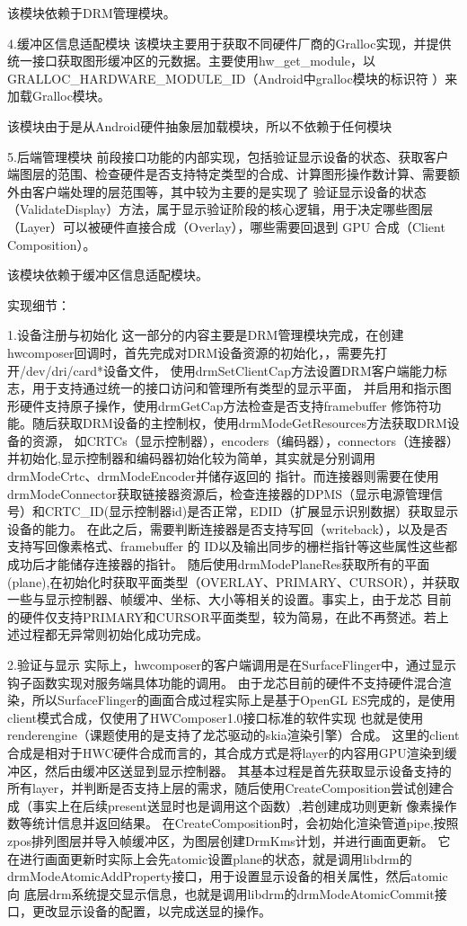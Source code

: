 该模块依赖于DRM管理模块。

4.缓冲区信息适配模块
该模块主要用于获取不同硬件厂商的Gralloc实现，并提供统一接口获取图形缓冲区的元数据。主要使用hw\_get\_module，以GRALLOC\_HARDWARE\_MODULE\_ID（Android中gralloc模块的标识符
）来加载Gralloc模块。

该模块由于是从Android硬件抽象层加载模块，所以不依赖于任何模块

5.后端管理模块
前段接口功能的内部实现，包括验证显示设备的状态、获取客户端图层的范围、检查硬件是否支持特定类型的合成、计算图形操作数计算、需要额外由客户端处理的层范围等，其中较为主要的是实现了
验证显示设备的状态（ValidateDisplay）方法，属于显示验证阶段的核心逻辑，用于决定哪些图层（Layer）可以被硬件直接合成（Overlay），哪些需要回退到 GPU 合成（Client Composition）。

该模块依赖于缓冲区信息适配模块。

实现细节：

1.设备注册与初始化
这一部分的内容主要是DRM管理模块完成，在创建hwcomposer回调时，首先完成对DRM设备资源的初始化，，需要先打开/dev/dri/card*设备文件，
使用drmSetClientCap方法设置DRM客户端能力标志，用于支持通过统一的接口访问和管理所有类型的显示平面，
并启用和指示图形硬件支持原子操作，使用drmGetCap方法检查是否支持framebuffer 修饰符功能。随后获取DRM设备的主控制权，使用drmModeGetResources方法获取DRM设备的资源，
如CRTCs（显示控制器），encoders（编码器），connectors（连接器）并初始化,显示控制器和编码器初始化较为简单，其实就是分别调用drmModeCrtc、drmModeEncoder并储存返回的
指针。而连接器则需要在使用drmModeConnector获取链接器资源后，检查连接器的DPMS（显示电源管理信号）和CRTC\_ID(显示控制器id)是否正常，EDID（扩展显示识别数据）获取显示设备的能力。
在此之后，需要判断连接器是否支持写回（writeback），以及是否支持写回像素格式、framebuffer 的 ID以及输出同步的栅栏指针等这些属性这些都成功后才能储存连接器的指针。
随后使用drmModePlaneRes获取所有的平面(plane),在初始化时获取平面类型（OVERLAY、PRIMARY、CURSOR），并获取一些与显示控制器、帧缓冲、坐标、大小等相关的设置。事实上，由于龙芯
目前的硬件仅支持PRIMARY和CURSOR平面类型，较为简易，在此不再赘述。若上述过程都无异常则初始化成功完成。

2.验证与显示
实际上，hwcomposer的客户端调用是在SurfaceFlinger中，通过显示钩子函数实现对服务端具体功能的调用。
由于龙芯目前的硬件不支持硬件混合渲染，所以SurfaceFlinger的画面合成过程实际上是基于OpenGL ES完成的，是使用client模式合成，仅使用了HWComposer1.0接口标准的软件实现
也就是使用renderengine（课题使用的是支持了龙芯驱动的skia渲染引擎）合成。
这里的client合成是相对于HWC硬件合成而言的，其合成方式是将layer的内容用GPU渲染到缓冲区，然后由缓冲区送显到显示控制器。
其基本过程是首先获取显示设备支持的所有layer，并判断是否支持上层的需求，随后使用CreateComposition尝试创建合成（事实上在后续present送显时也是调用这个函数）,若创建成功则更新
像素操作数等统计信息并返回结果。
在CreateComposition时，会初始化渲染管道pipe,按照zpos排列图层并导入帧缓冲区，为图层创建DrmKms计划，并进行画面更新。
它在进行画面更新时实际上会先atomic设置plane的状态，就是调用libdrm的drmModeAtomicAddProperty接口，用于设置显示设备的相关属性，然后atomic向
底层drm系统提交显示信息，也就是调用libdrm的drmModeAtomicCommit接口，更改显示设备的配置，以完成送显的操作。

